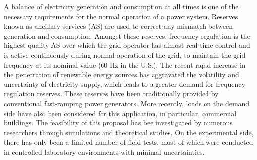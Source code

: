\documentclass[../../thesis.tex]{subfiles}
\begin{document}
%
%


%
%


A balance of electricity generation and consumption at all times is one of the necessary requirements for the normal operation of a power system. 
Reserves known as ancillary services (AS) are used to correct any mismatch between generation and consumption.
Amongst these reserves, frequency regulation is the highest quality AS over which the grid operator has almost real-time control and is active continuously during normal operation of the grid, to maintain the grid frequency at its nominal value (60 Hz in the U.S.).
The recent rapid increase in the penetration of renewable energy sources has aggravated the volatility and uncertainty of electricity supply, which leads to a greater demand for frequency regulation reserves.
These reserves have been traditionally provided by conventional fast-ramping power generators. 
More recently, loads on the demand side have also been considered for this application, in particular, commercial buildings.
The feasibility of this proposal has bee investigated by numerous researchers through simulations and theoretical studies.
On the experimental side, there has only been a limited number of field tests, most of which were conducted in controlled laboratory environments with minimal uncertainties.
\end{document}
